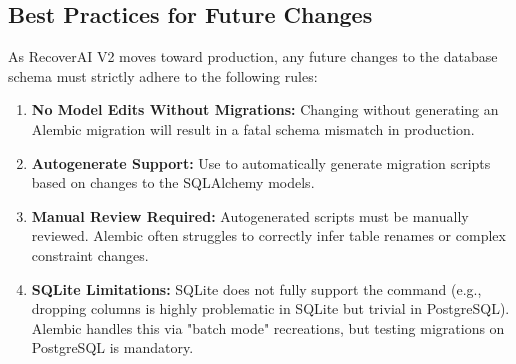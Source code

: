 \vspace{0.8cm}

\subsection{Best Practices for Future Changes}

As RecoverAI V2 moves toward production, any future changes to the database schema must strictly adhere to the following rules:

\begin{tcolorbox}[warningbox={Production Schema Rules}]
\begin{enumerate}
    \item \textbf{No Model Edits Without Migrations:} Changing  without generating an Alembic migration will result in a fatal schema mismatch in production.
    \item \textbf{Autogenerate Support:} Use  to automatically generate migration scripts based on changes to the SQLAlchemy models.
    \item \textbf{Manual Review Required:} Autogenerated scripts must be manually reviewed. Alembic often struggles to correctly infer table renames or complex constraint changes.
    \item \textbf{SQLite Limitations:} SQLite does not fully support the  command (e.g., dropping columns is highly problematic in SQLite but trivial in PostgreSQL). Alembic handles this via "batch mode" recreations, but testing migrations on PostgreSQL is mandatory.
\end{enumerate}
\end{tcolorbox}
